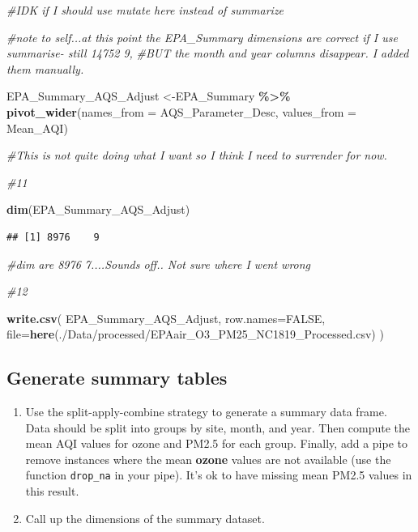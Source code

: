 \documentclass[
]{article}
\newenvironment{Shaded}{\begin{snugshade}}{\end{snugshade}}
\newcommand{\AttributeTok}[1]{\textcolor[rgb]{0.13,0.29,0.53}{#1}}
\newcommand{\CommentTok}[1]{\textcolor[rgb]{0.56,0.35,0.01}{\textit{#1}}}
\newcommand{\ConstantTok}[1]{\textcolor[rgb]{0.56,0.35,0.01}{#1}}
\newcommand{\FunctionTok}[1]{\textcolor[rgb]{0.13,0.29,0.53}{\textbf{#1}}}
\newcommand{\NormalTok}[1]{#1}
\newcommand{\OtherTok}[1]{\textcolor[rgb]{0.56,0.35,0.01}{#1}}
\newcommand{\SpecialCharTok}[1]{\textcolor[rgb]{0.81,0.36,0.00}{\textbf{#1}}}
\newcommand{\StringTok}[1]{\textcolor[rgb]{0.31,0.60,0.02}{#1}}
\begin{document}
\begin{Shaded}
\begin{Highlighting}[]
  \CommentTok{\#IDK if I should use mutate here instead of summarize}

\CommentTok{\#note to self...at this point the EPA\_Summary dimensions are correct if I use summarise{-} still 14752 9, }
\CommentTok{\#BUT the month and year columns disappear. I added them manually. }


\NormalTok{EPA\_Summary\_AQS\_Adjust }\OtherTok{\textless{}{-}}\NormalTok{EPA\_Summary }\SpecialCharTok{\%\textgreater{}\%} 
  \FunctionTok{pivot\_wider}\NormalTok{(}\AttributeTok{names\_from =}\NormalTok{ AQS\_Parameter\_Desc, }\AttributeTok{values\_from =}\NormalTok{ Mean\_AQI)}
  

\CommentTok{\#This is not quite doing what I want so I think I need to surrender for now. }


\CommentTok{\#11}

\FunctionTok{dim}\NormalTok{(EPA\_Summary\_AQS\_Adjust)}
\end{Highlighting}
\end{Shaded}

\begin{verbatim}
## [1] 8976    9
\end{verbatim}

\begin{Shaded}
\begin{Highlighting}[]
\CommentTok{\#dim are 8976 7....Sounds off.. Not sure where I went wrong}

\CommentTok{\#12}

\FunctionTok{write.csv}\NormalTok{(}
\NormalTok{  EPA\_Summary\_AQS\_Adjust, }
  \AttributeTok{row.names=}\ConstantTok{FALSE}\NormalTok{,}
  \AttributeTok{file=}\FunctionTok{here}\NormalTok{(}\StringTok{\textquotesingle{}./Data/processed/EPAair\_O3\_PM25\_NC1819\_Processed.csv\textquotesingle{}}\NormalTok{)}
\NormalTok{  )}
\end{Highlighting}
\end{Shaded}

\subsection{Generate summary tables}\label{generate-summary-tables}

\begin{enumerate}
\def\labelenumi{\arabic{enumi}.}
\setcounter{enumi}{12}
\item
  Use the split-apply-combine strategy to generate a summary data frame.
  Data should be split into groups by site, month, and year. Then
  compute the mean AQI values for ozone and PM2.5 for each group.
  Finally, add a pipe to remove instances where the mean \textbf{ozone}
  values are not available (use the function \texttt{drop\_na} in your
  pipe). It's ok to have missing mean PM2.5 values in this result.
\item
  Call up the dimensions of the summary dataset.
\end{enumerate}
\end{document}
